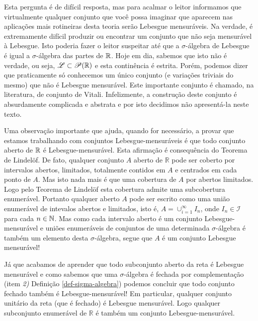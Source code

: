         Esta pergunta é de difícil resposta, mas para acalmar o leitor 
        informamos que virtualmente qualquer conjunto que você possa imaginar
        que aparecem nas aplicações mais rotineiras desta teoria 
        serão Lebesgue mensuráveis. 
        Na verdade, é extremamente difícil produzir ou encontrar um conjunto que não seja mensurável à Lebesgue. 
        Isto poderia fazer o leitor suspeitar até que a $\sigma$-álgebra
        de Lebesgue é igual a $\sigma$-álgebra das partes de $\mathbb{R}$.
        Hoje em dia, sabemos que isto não é verdade, ou seja, 
        $\mathscr{L}\subset \mathscr{P}(\mathbb{R})$ e esta continência é estrita. 
        Porém, podemos dizer que praticamente só conhecemos um único
        conjunto (e variações triviais do mesmo) que não é Lebesgue mensurável. 
        Este importante conjunto é chamado, na literatura, de conjunto 
        de Vitali. 
        Infelizmente, a construção deste conjunto é 
        absurdamente complicada e abstrata e por isto 
        decidimos não apresentá-la neste texto.
        
        Uma observação importante que ajuda, quando for necessário, a provar
        que estamos trabalhando com conjuntos Lebesgue-mensuráveis 
        é que todo conjunto aberto de $\mathbb{R}$ é Lebesgue-mensurável. 
        Esta afirmação
        é consequência do Teorema de Lindel\"of. De fato, 
        qualquer conjunto $A$ aberto de $\mathbb{R}$ pode
        ser coberto por intervalos abertos, limitados, 
        totalmente contidos em $A$ e centrados em cada ponto de $A$. 
        Mas isto nada mais é que uma cobertura de $A$
        por abertos limitados. Logo pelo Teorema de Lindelöf esta 
        cobertura admite uma subcobertura enumerável. 
        Portanto qualquer aberto $A$ pode ser escrito como uma
        união enumerável de intevalos abertos e limitados, isto é, 
        $A = \cup_{i=1}^{\infty} I_n$, onde $I_n\in\mathcal{I}$
        para cada $n\in\mathbb{N}$.
        Mas como cada intervalo aberto é um conjunto Lebesgue-mensurável 
        e uniões enumeráveis de conjuntos de uma determinada $\sigma$-álgebra
        é também um elemento desta $\sigma$-álgebra, segue que $A$ é um 
        conjunto Lebesgue mensurável!
        
        Já que acabamos de aprender que todo subconjunto aberto da reta é
        Lebesgue mensurável e como sabemos que uma $\sigma$-álgebra é 
        fechada por complementação (item {\it 2)} Definição \ref{def-sigma-algebra})
        podemos concluir que todo conjunto fechado também é 
        Lebesgue-mensurável! Em particular, qualquer conjunto unitário
        da reta (que é fechado) é Lebesgue mensurável. Logo qualquer 
        subconjunto enumerável de $\mathbb{R}$ é também um conjunto Lebesgue-mensurável. 
 
